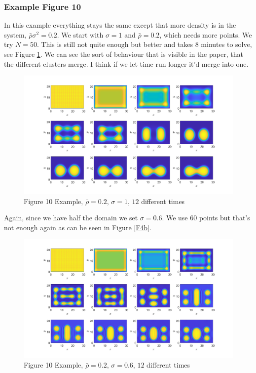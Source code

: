 \documentclass[11pt, a4paper]{article}
\theoremstyle{definition}
\begin{document}
	\subsubsection{Example Figure 10}
	In this example everything stays the same except that more density is in the system, $\bar \rho \sigma^2 = 0.2$. We start with $\sigma = 1$ and $\bar \rho = 0.2$, which needs more points. We try $N = 50$. This is still not quite enough but better and takes $8$ minutes to solve, see Figure \ref{F4}. We can see the sort of behaviour that is visible in the paper, that the different clusters merge. I think if we let time run longer it'd merge into one.
	\begin{figure}[h]
		\centering
		\includegraphics[scale=0.25]{Ex10F1.png}
		\caption{Figure 10 Example, $\bar \rho = 0.2$, $\sigma = 1$, $12$ different times} 
		\label{F4}
	\end{figure} 
	Again, since we have half the domain we set $\sigma = 0.6$. We use $60$ points but that's not enough again as can be seen in Figure \ref{F4b}.
	\begin{figure}[h]
		\centering
		\includegraphics[scale=0.25]{Ex10F2.png}
		\caption{Figure 10 Example, $\bar \rho = 0.2$, $\sigma = 0.6$, $12$ different times} 
		\label{F4a}
	\end{figure} 
	
\end{document}
